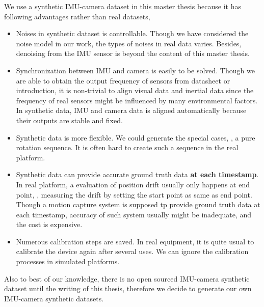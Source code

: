 	
	

We use a synthetic IMU-camera dataset in this master thesis because it has following advantages rather than real datasets,
\begin{itemize}
\item {Noises in synthetic dataset is controllable. Though we have considered the noise model in our work, the types of noises in real data varies. Besides, denoising from the IMU sensor is beyond the content of this master thesis. }
\item {Synchronization between IMU and camera is easily to be solved. Though we are able to obtain the output frequency of sensors from datasheet or introduction, it is non-trivial to align visual data and inertial data since the frequency of real sensors might be influenced by many environmental factors. In synthetic data, IMU and camera data is aligned automatically because their outputs are stable and fixed.}
\item {Synthetic data is more flexible. We could generate the special cases, \ie, a pure rotation sequence. It is often hard to create such a sequence in the real platform.}
\item {Synthetic data can provide accurate ground truth data \textbf{at each timestamp}. In real platform, a evaluation of position drift usually only happens at end point, \eg, measuring the drift by setting the start point as same as end point. Though a motion capture system is supposed tp provide ground truth data at each timestamp, accuracy of such system usually might be inadequate, and the cost is expensive.}
\item {Numerous calibration steps are saved. In real equipment, it is quite usual to calibrate the device again after several uses. We can ignore the calibration processes in simulated platforms.}
\end{itemize}
Also to best of our knowledge, there is no open sourced IMU-camera synthetic dataset until the writing of this thesis, therefore we decide to generate our own IMU-camera synthetic datasets.

